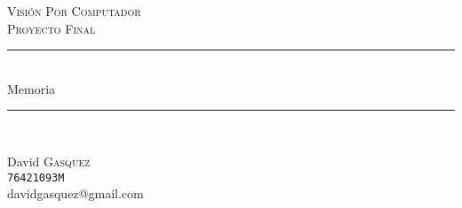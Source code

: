 \begin{titlepage}

\newcommand{\HRule}{\rule{\linewidth}{0.7mm}}

\center 
 

\textsc{\Huge Visión Por Computador}\\[2.5cm] 
\textsc{\LARGE Proyecto Final}\\[3cm]



\HRule \\[1cm]
{\fontsize{55}{60}\selectfont \sffamily Memoria}\\[0.6cm] 
\HRule \\[8.2cm]
 


\begin{minipage}{0.4\textwidth}
\begin{flushleft} \large
David \textsc{Gasquez}\\ %
\texttt{76421093M}\\
davidgasquez@gmail.com
\end{flushleft}
\end{minipage}
~
\begin{minipage}{0.4\textwidth}
\begin{flushright} \large
\end{flushright}
\end{minipage}\\[4cm]


\end{titlepage}
